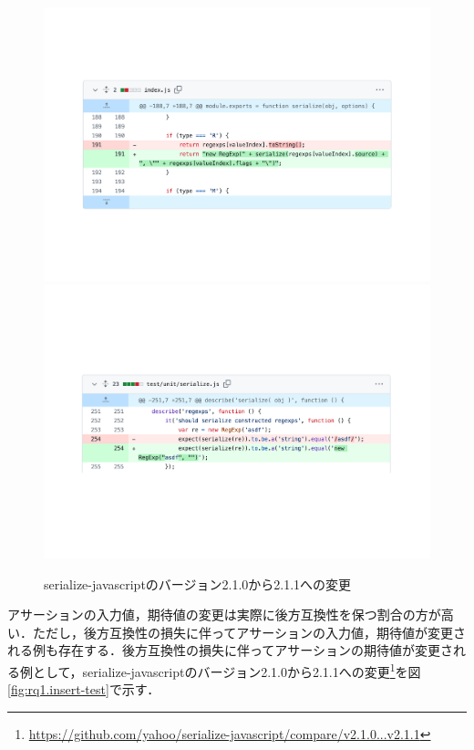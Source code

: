\documentclass[11pt,dvipdfmx]{jreport}
\begin{document}
\begin{figure}[t]
  \label{fig:rq1.change-test}
  \centering
  \includegraphics[width=1.0\linewidth]{fig/rq1/serialize-javascript/index.pdf}
  \includegraphics[width=1.0\linewidth]{fig/rq1/serialize-javascript/index.test.pdf}
  \caption{serialize-javascriptのバージョン2.1.0から2.1.1への変更}
\end{figure}

アサーションの入力値，期待値の変更は実際に後方互換性を保つ割合の方が高い．ただし，後方互換性の損失に伴ってアサーションの入力値，期待値が変更される例も存在する．後方互換性の損失に伴ってアサーションの期待値が変更される例として，serialize-javascriptのバージョン2.1.0から2.1.1への変更\footnote{\url{https://github.com/yahoo/serialize-javascript/compare/v2.1.0...v2.1.1}}を図\ref{fig:rq1.insert-test}で示す．
\end{document}
